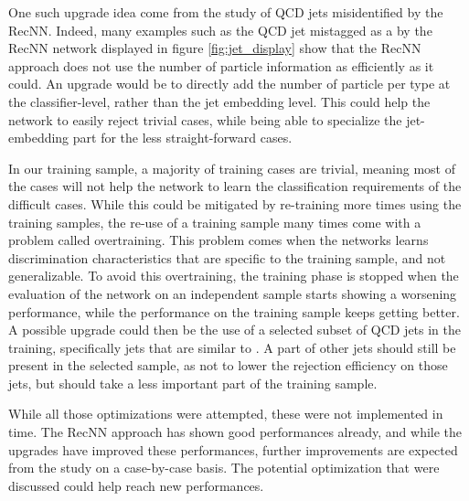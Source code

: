 One such upgrade idea come from the study of QCD jets misidentified by the RecNN. Indeed, many examples such as the QCD jet mistagged as a \tauh by the RecNN network displayed in figure \ref{fig:jet_display} show that the RecNN approach does not use the number of particle information as efficiently as it could. An upgrade would be to directly add the number of particle per type at the classifier-level, rather than the jet embedding level. This could help the network to easily reject trivial cases, while being able to specialize the jet-embedding part for the less straight-forward cases.

In our training sample, a majority of training cases are trivial, meaning most of the cases will not help the network to learn the classification requirements of the difficult cases. While this could be mitigated by re-training more times using the training samples, the re-use of a training sample many times come with a problem called overtraining. This problem comes when the networks learns discrimination characteristics that are specific to the training sample, and not generalizable. To avoid this overtraining, the training phase is stopped when the evaluation of the network on an independent sample starts showing a worsening performance, while the performance on the training sample keeps getting better. A possible upgrade could then be the use of a selected subset of QCD jets in the training, specifically jets that are similar to \tauh. A part of other jets should still be present in the selected sample, as not to lower the rejection efficiency on those jets, but should take a less important part of the training sample. 

While all those optimizations were attempted, these were not implemented in time. The RecNN approach has shown good performances already, and while the upgrades have improved these performances, further improvements are expected from the study on a case-by-case basis. The potential optimization that were discussed could help reach new performances.

